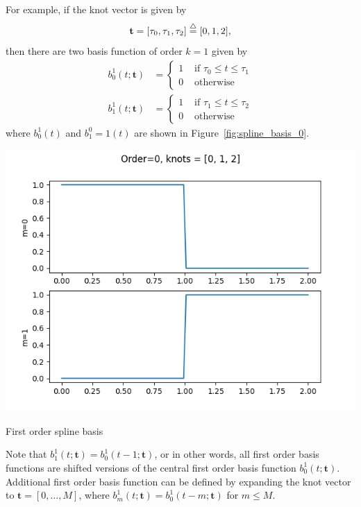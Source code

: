 For example, if the knot vector is given by
\[
\mathbf{t} = [\tau_0, \tau_1, \tau_2] \stackrel{\triangle}{=} [0, 1, 2],
\]
then there are two basis function of order $k=1$ given by
\begin{align*}
b_0^1(t; \mathbf{t}) &= \begin{cases} 1 & \text{~if~} \tau_0 \leq t \leq \tau_1 \\ 
 									 0 & \text{~otherwise} 
 			\end{cases}
\\ 
b_1^1(t; \mathbf{t}) &= \begin{cases} 1 & \text{~if~} \tau_1 \leq t \leq \tau_2 \\ 
 									 0 & \text{~otherwise}
 			\end{cases}
\end{align*}
where $b_0^1(t)$ and $b_1^0=1(t)$ are shown in Figure~\ref{fig:spline_basis_0}.
\begin{marginfigure}[0in]
  \includegraphics[width=\linewidth]{./chap5_trajectory_planning/figures/spline_basis_0}
  \caption{First order spline basis}
  \label{fig:spline_basis_0}  
\end{marginfigure}
Note that $b_1^1(t; \mathbf{t}) = b_0^1(t-1; \mathbf{t})$, or in other words, all first order basis functions are shifted versions of the central first order basis function $b_0^1(t; \mathbf{t})$.  Additional first order basis function can be defined by expanding the knot vector to $\mathbf{t}=[0, \dots, M]$, where $b_m^1(t; \mathbf{t})= b_0^1(t-m; \mathbf{t})$ for $m\leq M$.


\clearpage


\par{}

